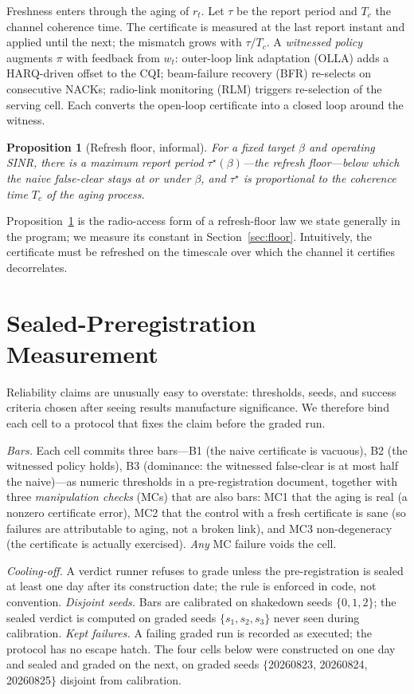 \documentclass[lettersize,onecolumn]{IEEEtran}
\newtheorem{proposition}{Proposition}
\theoremstyle{remark}
\begin{document}
Freshness enters through the aging of $r_t$. Let $\tau$ be the report period and
$T_c$ the channel coherence time. The certificate is measured at the last report
instant and applied until the next; the mismatch grows with $\tau/T_c$. A
\emph{witnessed policy} augments $\pi$ with feedback from $w_t$: outer-loop link
adaptation (OLLA) adds a HARQ-driven offset to the CQI; beam-failure recovery
(BFR) re-selects on consecutive NACKs; radio-link monitoring (RLM) triggers
re-selection of the serving cell. Each converts the open-loop certificate into a
closed loop around the witness.

\begin{proposition}[Refresh floor, informal]\label{prop:floor}
For a fixed target $\beta$ and operating SINR, there is a maximum report period
$\tau^\star(\beta)$---the \emph{refresh floor}---below which the naive
false-clear stays at or under $\beta$, and $\tau^\star$ is proportional to the
coherence time $T_c$ of the aging process.
\end{proposition}
Proposition~\ref{prop:floor} is the radio-access form of a refresh-floor law we
state generally in the program; we measure its constant in
Section~\ref{sec:floor}. Intuitively, the certificate must be refreshed on the
timescale over which the channel it certifies decorrelates.

\section{Sealed-Preregistration Measurement}\label{sec:protocol}
Reliability claims are unusually easy to overstate: thresholds, seeds, and
success criteria chosen after seeing results manufacture significance. We
therefore bind each cell to a protocol that fixes the claim before the graded
run.

\emph{Bars.} Each cell commits three bars---B1 (the naive certificate is
vacuous), B2 (the witnessed policy holds), B3 (dominance: the witnessed
false-clear is at most half the naive)---as numeric thresholds in a
pre-registration document, together with three \emph{manipulation checks}
(MCs) that are also bars: MC1 that the aging is real (a nonzero certificate
error), MC2 that the control with a fresh certificate is sane (so failures are
attributable to aging, not a broken link), and MC3 non-degeneracy (the
certificate is actually exercised). \emph{Any} MC failure voids the cell.

\emph{Cooling-off.} A verdict runner refuses to grade unless the
pre-registration is sealed at least one day after its construction date; the
rule is enforced in code, not convention. \emph{Disjoint seeds.} Bars are
calibrated on shakedown seeds $\{0,1,2\}$; the sealed verdict is computed on
graded seeds $\{s_1,s_2,s_3\}$ never seen during calibration. \emph{Kept
failures.} A failing graded run is recorded as executed; the protocol has no
escape hatch. The four cells below were constructed on one day and sealed and
graded on the next, on graded seeds $\{$20260823, 20260824, 20260825$\}$
disjoint from calibration.
\end{document}
